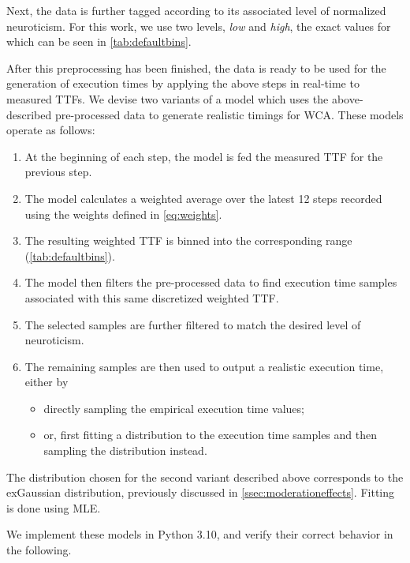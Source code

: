 Next, the data is further tagged according to its associated level of normalized neuroticism.
For this work, we use two levels, \emph{low} and \emph{high}, the exact values for which can be seen in \cref{tab:defaultbins}.

After this preprocessing has been finished, the data is ready to be used for the generation of execution times by applying the above steps in real-time to measured \acp{TTF}.
We devise two variants of a model which uses the above-described pre-processed data to generate realistic timings for \ac{WCA}.
These models operate as follows:

\begin{enumerate}
    \item At the beginning of each step, the model is fed the measured \ac{TTF} for the previous step.
    \item The model calculates a weighted average over the latest \num{12} steps recorded using the weights defined in \cref{eq:weights}.
    \item The resulting weighted \ac{TTF} is binned into the corresponding range (\cref{tab:defaultbins}).
    \item The model then filters the pre-processed data to find execution time samples associated with this same discretized weighted \ac{TTF}.
    \item The selected samples are further filtered to match the desired level of neuroticism.
    \item The remaining samples are then used to output a realistic execution time, either by
    \begin{itemize}
        \item directly sampling the empirical execution time values;
        \item or, first fitting a distribution to the execution time samples and then sampling the distribution instead.
    \end{itemize}
\end{enumerate}

The distribution chosen for the second variant described above corresponds to the \ac{exGaussian} distribution, previously discussed in \cref{ssec:moderationeffects}.
Fitting is done using \ac{MLE}.

We implement these models in Python 3.10, and verify their correct behavior in the following.


